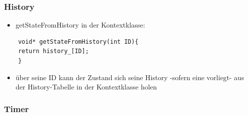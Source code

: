 \documentclass{beamer}
\begin{document}
\begin{frame}[fragile]
	\frametitle{History}
	\begin{itemize}
		\item getStateFromHistory in der Kontextklasse:
	\end{itemize}
	\begin{lstlisting}
	void* getStateFromHistory(int ID){
	return history_[ID];
	}
	\end{lstlisting}
	\begin{itemize}
		\item \"uber seine ID kann der Zustand sich seine History -sofern eine vorliegt- aus der History-Tabelle in der Kontextklasse holen
	\end{itemize}
\end{frame}


\begin{frame}
 \frametitle{Timer}
\end{frame}
\end{document}
